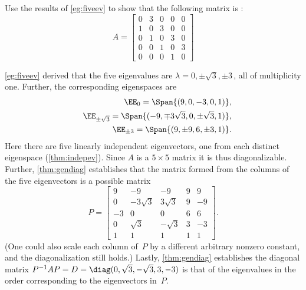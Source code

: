\begin{example} \label{eg:fiveevp}
Use the results of \cref{eg:fiveev} to show that the following matrix is :
\begin{equation*}
A=\begin{bmatrix}0&3&0&0&0
\\1&0&3&0&0
\\0&1&0&3&0
\\0&0&1&0&3
\\0&0&0&1&0\end{bmatrix}
\end{equation*}
\begin{solution} 
\cref{eg:fiveev} derived that the five eigenvalues are  \(\lambda=0,\pm\sqrt3,\pm3\)\,, all of multiplicity one.
Further, the corresponding eigenspaces are
\begin{eqnarray*}
&&\EE_0=\Span\{(9,0,-3,0,1)\},
\\&&\EE_{\pm\sqrt3}=\Span\{(-9,\mp3\sqrt3,0,\pm\sqrt3,1)\},
\\&&\EE_{\pm3}=\Span\{(9,\pm9,6,\pm3,1)\}.
\end{eqnarray*}
Here there are five linearly independent eigenvectors, one from each distinct eigenspace  (\cref{thm:indepev}).
Since \(A\) is a \(5\times5\) matrix it is thus diagonalizable.
Further, \cref{thm:gendiag} establishes that the matrix formed from the columns of the five eigenvectors is a possible matrix
\begin{equation*}
P=\begin{bmatrix} 9&-9&-9&9&9
\\0&-3\sqrt3&3\sqrt3&9&-9
\\-3&0&0&6&6
\\0&\sqrt3&-\sqrt3&3&-3
\\1&1&1&1&1
\end{bmatrix}.
\end{equation*}
(One could also scale each column of~\(P\) by a different arbitrary nonzero constant, and the diagonalization still holds.)
Lastly, \cref{thm:gendiag} establishes the diagonal matrix
\(P^{-1}AP=D=\diag(0,\sqrt3,-\sqrt3,3,-3)\) is that of the eigenvalues in the order corresponding to the eigenvectors in~\(P\).
\end{solution}
\end{example}





